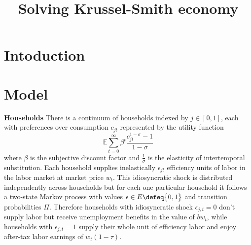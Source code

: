 \documentclass[a4paper,11pt]{article}  %
\title{Solving Krussel-Smith economy\vspace{-4em}}
\date{}
\begin{document}
\maketitle

\begin{abstract}

\end{abstract}

\section{Intoduction} %
\label{sec:intoduction}


\section{Model} %
\label{sec:model}

\textbf{Households} \quad There is a continuum of households indexed by $ j\in [0,1] $, each with preferences over consumption
$ c_{jt} $ represented by the utility function
\begin{equation*}
   \label{eq:util}
   \mathbb{E}  \sum_{t=0}^{\infty} \beta^t \frac{ c_{jt}^{1- \sigma} -1}{ 1- \sigma }
\end{equation*}
where $ \beta $ is the subjective discount factor and $ \frac{1}{\sigma} $ is the elasticity of intertemporal substitution.
%
Each household supplies inelastically $ \epsilon_{jt} $ efficiency units of labor in the labor market at market price $w_t$.
This idiosyncratic shock is distributed independently across households but for each one particular
household it follows a two-state Markov process with values $\epsilon \in E\defeq  \big\{ 0,1 \big\} $ and transition probabilities $ \Pi $.
Therefore households with idiosyncratic shock $ \epsilon_{j,t} = 0 $ don't supply labor but receive
unemployment benefits in the value of $ bw_t $, while households with $\epsilon_{j,t}=1$ supply their whole unit of efficiency labor
and enjoy after-tax labor earnings of $ w_t ( 1-\tau ) $.
\end{document}
